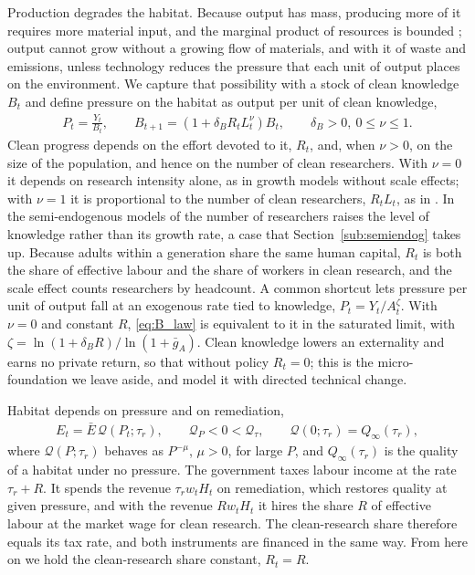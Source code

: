 \documentclass[11pt]{article}
\begin{document}
Production degrades the habitat. Because output has mass, producing more of it requires more material
input, and the marginal product of resources is bounded \citep{DZHUMASHEV2024}; output cannot grow
without a growing flow of materials, and with it of waste and emissions, unless technology reduces the
pressure that each unit of output places on the environment. We capture that possibility with a stock of
clean knowledge $B_t$ and define pressure on the habitat as output per unit of clean knowledge,
\begin{align}
P_t=\frac{Y_t}{B_t},
\qquad
B_{t+1}=\left(1+\delta_B R_tL_t^{\nu}\right)B_t,
\qquad \delta_B>0,\ 0\le\nu\le1 .
\label{eq:B_law}
\end{align}
Clean progress depends on the effort devoted to it, $R_t$, and, when $\nu>0$, on the size of the
population, and hence on the number of clean researchers. With $\nu=0$ it depends on research intensity alone, as in
growth models without scale effects; with $\nu=1$ it is proportional to the number of clean
researchers, $R_tL_t$, as in \citet{romer1990}. In the semi-endogenous models of \citet{jones1995} the
number of researchers raises the level of knowledge rather than its growth rate, a case that
Section~\ref{sub:semiendog} takes up. Because
adults within a generation share the same human capital, $R_t$ is both the share of effective labour
and the share of workers in clean research, and the scale effect counts researchers by headcount.
A common shortcut lets pressure per unit of output fall at an exogenous rate tied to knowledge,
$P_t=Y_t/A_t^{\zeta}$. With $\nu=0$ and constant $R$, \eqref{eq:B_law} is equivalent to it in the
saturated limit, with $\zeta=\ln(1+\delta_BR)/\ln(1+\bar g_A)$. Clean knowledge lowers an externality and earns no private return, so that without policy
$R_t=0$; this is the micro-foundation we leave aside, and \citet{beulmann2025} model it with directed
technical change.

Habitat depends on pressure and on remediation,
\begin{align}
E_t=\bar E\,\mathcal{Q}(P_t;\tau_r),
\qquad \mathcal{Q}_P<0<\mathcal{Q}_\tau,
\qquad \mathcal{Q}(0;\tau_r)=Q_\infty(\tau_r),
\label{eq:pressure}
\end{align}
where $\mathcal{Q}(P;\tau_r)$ behaves as $P^{-\mu}$, $\mu>0$, for large $P$, and $Q_\infty(\tau_r)$ is the
quality of a habitat under no pressure. The government taxes labour income at the rate $\tau_r+R$. It
spends the revenue $\tau_r w_tH_t$ on remediation, which restores quality at given pressure, and with the
revenue $Rw_tH_t$ it hires the share $R$ of effective labour at the market wage for clean research. The
clean-research share therefore equals its tax rate, and both instruments are financed in the same way.
From here on we hold the clean-research share constant, $R_t=R$.
\end{document}
